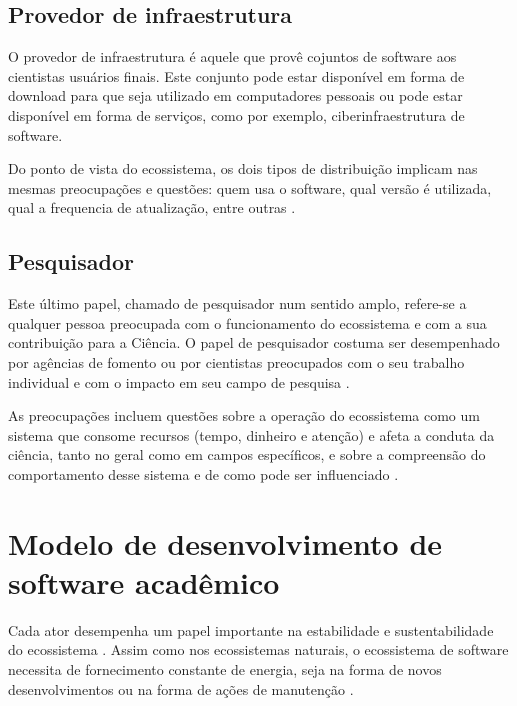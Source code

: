 \subsection{Provedor de infraestrutura}

O provedor de infraestrutura é aquele que provê cojuntos de software aos
cientistas usuários finais. Este conjunto pode estar disponível em forma de
download para que seja utilizado em computadores pessoais ou pode estar
disponível em forma de serviços, como por exemplo, ciberinfraestrutura
\cite{council2007cyberinfrastructure, stewart2010cyberinfrastructure} de
software.

Do ponto de vista do ecossistema, os dois tipos de distribuição implicam nas
mesmas preocupações e questões: quem usa o software, qual versão é utilizada, 
qual a frequencia de atualização, entre outras \cite{howison2015understanding}.

\subsection{Pesquisador}

Este último papel, chamado de pesquisador num sentido amplo, refere-se a
qualquer pessoa preocupada com o funcionamento do ecossistema e com a sua
contribuição para a Ciência. O papel de pesquisador costuma ser desempenhado
por agências de fomento ou por cientistas preocupados com o seu trabalho
individual e com o impacto em seu campo de pesquisa
\cite{howison2015understanding}.

As preocupações incluem questões sobre a operação do ecossistema
como um sistema que consome recursos (tempo, dinheiro e atenção) e afeta a
conduta da ciência, tanto no geral como em campos específicos, 
e sobre a compreensão do comportamento desse sistema e de 
como pode ser influenciado \cite{howison2015understanding}.

\section{Modelo de desenvolvimento de software acadêmico}


Cada ator desempenha um papel importante na estabilidade e sustentabilidade do
ecossistema \cite{dhungana2010software}. Assim como nos ecossistemas naturais,
o ecossistema de software necessita de fornecimento constante de energia, seja
na forma de novos desenvolvimentos ou na forma de ações de manutenção
\cite{dhungana2010software}.

